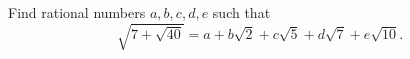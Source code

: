 Find rational numbers $a, b, c, d, e$ such that
$$ \sqrt{7 + \sqrt{40}} = a + b\sqrt{2} + c\sqrt{5} + d\sqrt{7} + e\sqrt{10}. $$
